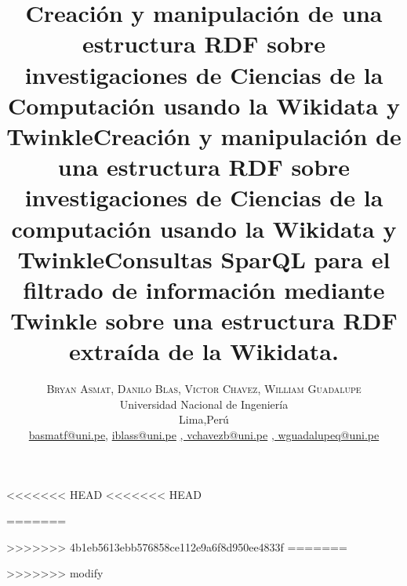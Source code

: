 \documentclass[conference]{IEEEtran}
\begin{document}
<<<<<<< HEAD
<<<<<<< HEAD
\title{\bf{Creación y manipulación de una estructura RDF sobre investigaciones de Ciencias de la Computación usando la Wikidata y Twinkle}}
=======
\title{\bf{Creación y manipulación de una estructura RDF sobre investigaciones de Ciencias de la computación usando la Wikidata y Twinkle}}
>>>>>>> 4b1eb5613ebb576858ce112e9a6f8d950ee4833f
=======
\title{\bf{Consultas SparQL para el filtrado de información mediante Twinkle sobre una estructura RDF extraída de la Wikidata. }}
>>>>>>> modify

\author{%
\textsc{Bryan Asmat}\textsc{, Danilo Blas}\textsc{, Victor Chavez}\textsc{, William Guadalupe}\\
\normalsize Universidad Nacional de Ingeniería \\ %
\normalsize Lima,Perú \\ %
\normalsize \href{mailto:basmatf@uni.pe}{basmatf@uni.pe},  \href{mailto:iblass@uni.pe}{iblass@uni.pe} \href{mailto:vchavezb@uni.pe}{,  vchavezb@uni.pe} \href{mailto:wguadalupeq@uni.pe}{,  wguadalupeq@uni.pe} %
}
\end{document}
